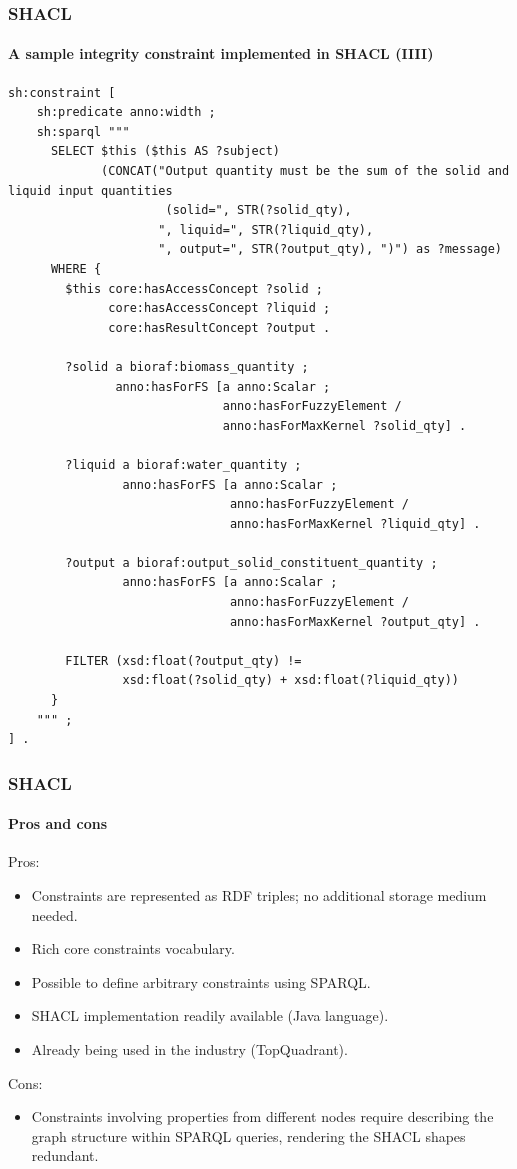 \documentclass{beamer}
\begin{document}
\begin{frame}[fragile]
  \frametitle{SHACL}
  \framesubtitle{A sample integrity constraint implemented in SHACL (IIII)}

  \begin{Verbatim}[fontsize=\tiny]
  sh:constraint [
    sh:predicate anno:width ;
    sh:sparql """
      SELECT $this ($this AS ?subject)
             (CONCAT("Output quantity must be the sum of the solid and liquid input quantities
                      (solid=", STR(?solid_qty),
                     ", liquid=", STR(?liquid_qty),
                     ", output=", STR(?output_qty), ")") as ?message)
      WHERE {
        $this core:hasAccessConcept ?solid ;
              core:hasAccessConcept ?liquid ;
              core:hasResultConcept ?output .

        ?solid a bioraf:biomass_quantity ;
               anno:hasForFS [a anno:Scalar ;
                              anno:hasForFuzzyElement /
                              anno:hasForMaxKernel ?solid_qty] .

        ?liquid a bioraf:water_quantity ;
                anno:hasForFS [a anno:Scalar ;
                               anno:hasForFuzzyElement /
                               anno:hasForMaxKernel ?liquid_qty] .

        ?output a bioraf:output_solid_constituent_quantity ;
                anno:hasForFS [a anno:Scalar ;
                               anno:hasForFuzzyElement /
                               anno:hasForMaxKernel ?output_qty] .

        FILTER (xsd:float(?output_qty) !=
                xsd:float(?solid_qty) + xsd:float(?liquid_qty))
      }
    """ ;
] .

  \end{Verbatim}
\end{frame}

\begin{frame}
  \frametitle{SHACL}
  \framesubtitle{Pros and cons}

  Pros:

  \begin{itemize}
    \item Constraints are represented as RDF triples; no additional storage
      medium needed.
    \item Rich core constraints vocabulary.
    \item Possible to define arbitrary constraints using SPARQL.
    \item SHACL implementation readily available (Java language).
    \item Already being used in the industry (TopQuadrant).
  \end{itemize}

  Cons:

  \begin{itemize}
    \item Constraints involving properties from different nodes require
      describing the graph structure within SPARQL queries, rendering the
      SHACL shapes redundant.
  \end{itemize}
\end{frame}
\end{document}
